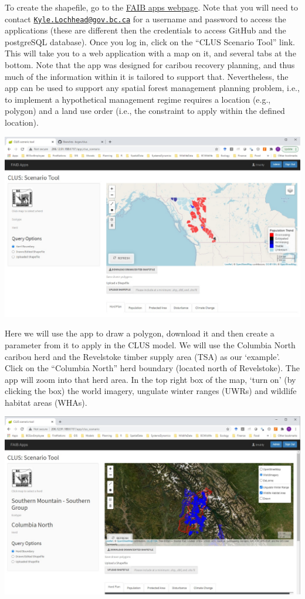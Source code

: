 \documentclass[
]{article}
\begin{document}
To create the shapefile, go to the
\href{http://206.12.91.188:8787/login}{FAIB apps webpage}. Note that you
will need to contact
\href{mailto:Kyle.Lochhead@gov.bc.ca}{\nolinkurl{Kyle.Lochhead@gov.bc.ca}}
for a username and password to access the applications (these are
different then the credentials to access GitHub and the postgreSQL
database). Once you log in, click on the ``CLUS Scenario Tool'' link.
This will take you to a web application with a map on it, and several
tabs at the bottom. Note that the app was designed for caribou recovery
planning, and thus much of the information within it is tailored to
support that. Nevertheless, the app can be used to support any spatial
forest management planning problem, i.e., to implement a hypothetical
management regime requires a location (e.g., polygon) and a land use
order (i.e., the constraint to apply within the defined location).

\includegraphics{images/scen_tool.jpg}

Here we will use the app to draw a polygon, download it and then create
a parameter from it to apply in the CLUS model. We will use the Columbia
North caribou herd and the Revelstoke timber supply area (TSA) as our
`example'. Click on the ``Columbia North'' herd boundary (located north
of Revelstoke). The app will zoom into that herd area. In the top right
box of the map, `turn on' (by clicking the box) the world imagery,
ungulate winter ranges (UWRs) and wildlife habitat areas (WHAs).

\includegraphics{images/scen_tool_cn.jpg}
\end{document}
